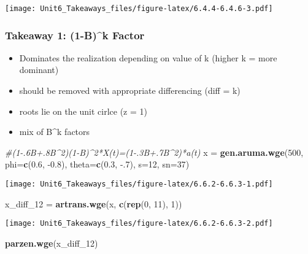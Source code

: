 \documentclass[
]{article}
\newenvironment{Shaded}{\begin{snugshade}}{\end{snugshade}}
\newcommand{\CommentTok}[1]{\textcolor[rgb]{0.56,0.35,0.01}{\textit{#1}}}
\newcommand{\DataTypeTok}[1]{\textcolor[rgb]{0.13,0.29,0.53}{#1}}
\newcommand{\DecValTok}[1]{\textcolor[rgb]{0.00,0.00,0.81}{#1}}
\newcommand{\FloatTok}[1]{\textcolor[rgb]{0.00,0.00,0.81}{#1}}
\newcommand{\KeywordTok}[1]{\textcolor[rgb]{0.13,0.29,0.53}{\textbf{#1}}}
\newcommand{\NormalTok}[1]{#1}
\newcommand{\StringTok}[1]{\textcolor[rgb]{0.31,0.60,0.02}{#1}}
\providecommand{\tightlist}{%
  \setlength{\itemsep}{0pt}\setlength{\parskip}{0pt}}
\begin{document}
\texttt{[image: Unit6\_Takeaways\_files/figure-latex/6.4.4-6.4.6-3.pdf]}

\hypertarget{takeaway-1-1-bk-factor}{%
\subsubsection{Takeaway 1: (1-B)\^{}k
Factor}\label{takeaway-1-1-bk-factor}}

\begin{itemize}
\tightlist
\item
  Dominates the realization depending on value of k (higher k = more
  dominant)
\item
  should be removed with appropriate differencing (diff = k)
\item
  roots lie on the unit cirlce (z = 1)
\item
  mix of B\^{}k factors
\end{itemize}

\begin{Shaded}
\begin{Highlighting}[]
\CommentTok{#(1-.6B+.8B^2)(1-B)^2*X(t)=(1-.3B+.7B^2)*a(t)}
\NormalTok{x =}\StringTok{ }\KeywordTok{gen.aruma.wge}\NormalTok{(}\DecValTok{500}\NormalTok{, }\DataTypeTok{phi=}\KeywordTok{c}\NormalTok{(}\FloatTok{0.6}\NormalTok{, }\FloatTok{-0.8}\NormalTok{), }\DataTypeTok{theta=}\KeywordTok{c}\NormalTok{(}\FloatTok{0.3}\NormalTok{, }\FloatTok{-.7}\NormalTok{), }\DataTypeTok{s=}\DecValTok{12}\NormalTok{, }\DataTypeTok{sn=}\DecValTok{37}\NormalTok{)}
\end{Highlighting}
\end{Shaded}

\texttt{[image: Unit6\_Takeaways\_files/figure-latex/6.6.2-6.6.3-1.pdf]}

\begin{Shaded}
\begin{Highlighting}[]
\NormalTok{x_diff_}\DecValTok{12}\NormalTok{ =}\StringTok{ }\KeywordTok{artrans.wge}\NormalTok{(x, }\KeywordTok{c}\NormalTok{(}\KeywordTok{rep}\NormalTok{(}\DecValTok{0}\NormalTok{, }\DecValTok{11}\NormalTok{), }\DecValTok{1}\NormalTok{))}
\end{Highlighting}
\end{Shaded}

\texttt{[image: Unit6\_Takeaways\_files/figure-latex/6.6.2-6.6.3-2.pdf]}

\begin{Shaded}
\begin{Highlighting}[]
\KeywordTok{parzen.wge}\NormalTok{(x_diff_}\DecValTok{12}\NormalTok{)}
\end{Highlighting}
\end{Shaded}
\end{document}
